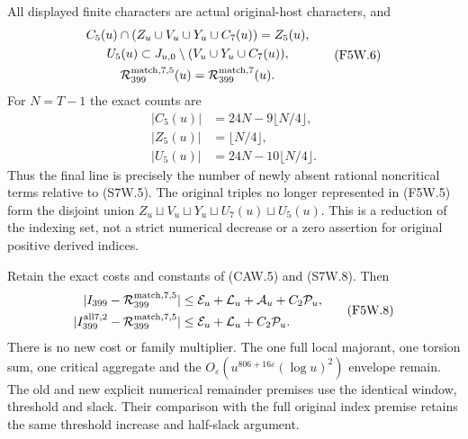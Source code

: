 \begin{theorem}
\label{AC-G200-window}
All displayed finite characters are actual original-host characters,
and
\[
 \begin{gathered}
 C_5(u)\cap(Z_u\cup V_u\cup Y_u\cup C_7(u))=Z_5(u),\\
 U_5(u)\subset J_{u,0}\setminus(V_u\cup Y_u\cup C_7(u)),\\
 \mathcal R_{399}^{\rm match,7,5}(u)
                      =\mathcal R_{399}^{\rm match,7}(u).
 \end{gathered}\tag{F5W.6}
\]
For $N=T-1$ the exact counts are
\[
 \begin{aligned}
 |C_5(u)|&=24N-9\lfloor N/4\rfloor,\\
 |Z_5(u)|&=\lfloor N/4\rfloor,\\
 |U_5(u)|&=24N-10\lfloor N/4\rfloor.
 \end{aligned}\tag{F5W.7}
\]
Thus the final line is precisely the number of newly absent
rational noncritical terms relative to (S7W.5).
The original triples no longer represented in (F5W.5) form
the disjoint union
$Z_u\sqcup V_u\sqcup Y_u\sqcup U_7(u)\sqcup U_5(u)$.
This is a reduction of the indexing set, not a strict numerical
decrease or a zero assertion for original positive derived indices.

Retain the exact costs and constants of (CAW.5) and (S7W.8).
Then
\[
 \begin{aligned}
 |I_{399}-\mathcal R_{399}^{\rm match,7,5}|&\leq
           \mathcal E_u+\mathcal L_u+\mathcal A_u+C_2\mathcal P_u,\\
 |I_{399}^{\rm all7,2}-\mathcal R_{399}^{\rm match,7,5}|&\leq
           \mathcal E_u+\mathcal L_u+C_2\mathcal P_u.
 \end{aligned}\tag{F5W.8}
\]
There is no new cost or family multiplier. The one full local
majorant, one torsion sum, one critical aggregate and the
$O_\varepsilon(u^{806+16\varepsilon}(\log u)^2)$ envelope remain.
The old and new explicit numerical remainder premises use the
identical window, threshold and slack. Their comparison with the
full original index premise retains the same threshold increase
and half-slack argument.
\end{theorem}

